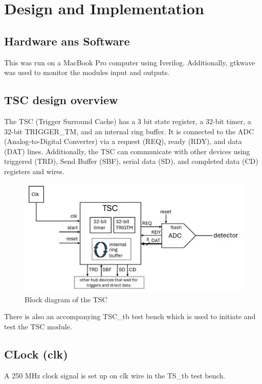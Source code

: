 \section{Design and Implementation }

\subsection{Hardware ans Software}
This was run on a MacBook Pro computer using Iverilog. Additionally, gtkwave was used to monitor the modules input and outputs.

\subsection{TSC design overview}

The TSC (Trigger Surround Cache) has a 3 bit state register, a 32-bit timer,
a 32-bit TRIGGER\_TM, and an internal ring buffer.
It is connected to the ADC (Analog-to-Digital Converter)
via a request (REQ), ready (RDY), and data (DAT) lines.
Additionally, the TSC can communicate with other devices using triggered (TRD), Send Buffer (SBF),
serial data (SD), and completed data (CD) registers and wires.


\begin{figure}[H]
      \centering
      \includegraphics[width=0.8\columnwidth]{Figures/block_diagram_of_TSC}
      \caption{Block diagram of the TSC}
      \label{fig:block diagram of TSC}
\end{figure}

There is also an accompanying TSC\_tb test bench which is used to initiate and test the TSC module.

\subsection{CLock (clk)}
A 250 MHz clock signal is set up on clk wire in the TS\_tb test bench.

